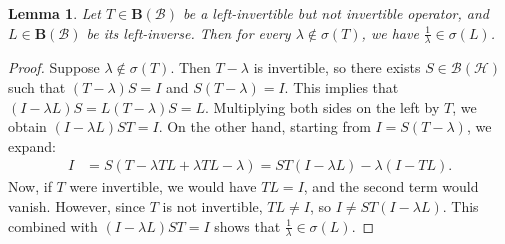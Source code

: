 \documentclass[reqno]{amsproc}
\numberwithin{equation}{section}
\newtheorem{lemma}[theorem]{Lemma}
\theoremstyle{remark}
\newcommand*{\bou}{\boldsymbol{B}}
\theoremstyle{definition}
\newcommand{\bspace}{\mathcal{B}}
\begin{document}
\begin{lemma}\label{nickry}
    Let $T\in \bou(\bspace)$ be a left-invertible but not invertible operator, and $L\in \bou(\bspace)$ be its left-inverse. 
    Then for every $\lambda \notin \sigma(T)$, we have $\frac{1}{\lambda} \in \sigma(L)$.
\end{lemma}
\begin{proof}
Suppose $\lambda \notin \sigma(T)$. Then $T - \lambda$ is invertible, so there exists $S \in \mathcal{B}(\mathcal{H})$ such that $(T-\lambda)S=I$ and $S(T-\lambda)=I$.  This implies that $(I-\lambda L)S=L(T-\lambda)S=L$.
Multiplying both sides on the left by $T$, we obtain
$(I-\lambda L)ST=I$. 
On the other hand, starting from $I = S(T - \lambda)$, we expand:
\begin{align*}
I &= S(T - \lambda TL + \lambda TL - \lambda) = ST(I - \lambda L) - \lambda(I - TL).
\end{align*}
Now, if $T$ were invertible, we would have $TL = I$, and the second term would vanish. However, since $T$ is not invertible, $TL \ne I$, so $I \ne ST(I - \lambda L)$. This combined with $(I-\lambda L)ST=I$ shows that $\frac{1}{\lambda}\in \sigma(L)$.
\end{proof}
\end{document}
